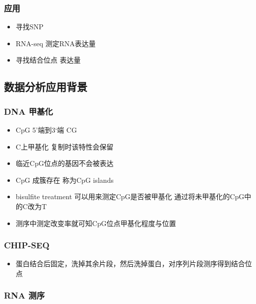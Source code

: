 \documentclass[]{book}
\providecommand{\tightlist}{%
  \setlength{\itemsep}{0pt}\setlength{\parskip}{0pt}}
\begin{document}
\hypertarget{ux5e94ux7528-2}{%
\subsubsection{应用}\label{ux5e94ux7528-2}}

\begin{itemize}
\tightlist
\item
  寻找SNP
\item
  RNA-seq 测定RNA表达量
\item
  寻找结合位点 表达量
\end{itemize}

\hypertarget{ux6570ux636eux5206ux6790ux5e94ux7528ux80ccux666f}{%
\subsection{数据分析应用背景}\label{ux6570ux636eux5206ux6790ux5e94ux7528ux80ccux666f}}

\hypertarget{dna-ux7532ux57faux5316}{%
\subsubsection{DNA 甲基化}\label{dna-ux7532ux57faux5316}}

\begin{itemize}
\tightlist
\item
  CpG 5'端到3`端 CG
\item
  C上甲基化 复制时该特性会保留
\item
  临近CpG位点的基因不会被表达
\item
  CpG 成簇存在 称为CpG islands
\item
  bisulfite treatment 可以用来测定CpG是否被甲基化 通过将未甲基化的CpG中的C改为T
\item
  测序中测定改变率就可知CpG位点甲基化程度与位置
\end{itemize}

\hypertarget{chip-seq}{%
\subsubsection{CHIP-SEQ}\label{chip-seq}}

\begin{itemize}
\tightlist
\item
  蛋白结合后固定，洗掉其余片段，然后洗掉蛋白，对序列片段测序得到结合位点
\end{itemize}

\hypertarget{rna-ux6d4bux5e8f}{%
\subsubsection{RNA 测序}\label{rna-ux6d4bux5e8f}}
\end{document}
